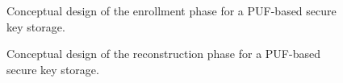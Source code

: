 \begin{figure}[]
\centering
{}
\caption{Conceptual design of the enrollment phase for a PUF-based secure key storage.}
\label{img:fz_2}
\end{figure}

\begin{figure}[]
\centering
{}
\caption{Conceptual design of the reconstruction phase for a PUF-based secure key storage.}
\label{img:fz_3}
\end{figure}

